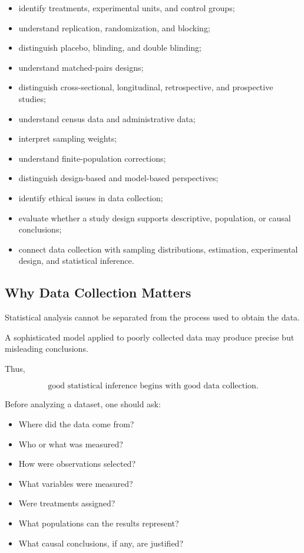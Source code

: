 {\begin{itemize}
    \item identify treatments, experimental units, and control groups;
    \item understand replication, randomization, and blocking;
    \item distinguish placebo, blinding, and double blinding;
    \item understand matched-pairs designs;
    \item distinguish cross-sectional, longitudinal, retrospective, and
          prospective studies;
    \item understand census data and administrative data;
    \item interpret sampling weights;
    \item understand finite-population corrections;
    \item distinguish design-based and model-based perspectives;
    \item identify ethical issues in data collection;
    \item evaluate whether a study design supports descriptive,
          population, or causal conclusions;
    \item connect data collection with sampling distributions,
          estimation, experimental design, and statistical inference.
\end{itemize}
}

\subsection{Why Data Collection Matters}
\label{subsec:why-data-collection-matters}

Statistical analysis cannot be separated from the process used to obtain
the data.

A sophisticated model applied to poorly collected data may produce
precise but misleading conclusions.

Thus,

\[
\boxed{
\text{good statistical inference begins with good data collection}.
}
\]

Before analyzing a dataset, one should ask:

\begin{itemize}
    \item Where did the data come from?
    \item Who or what was measured?
    \item How were observations selected?
    \item What variables were measured?
    \item Were treatments assigned?
    \item What populations can the results represent?
    \item What causal conclusions, if any, are justified?
\end{itemize}

